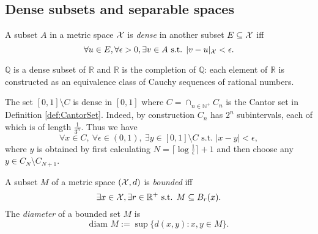 \subsection{Dense subsets and separable spaces}
\label{sec:dense-subsets}

\begin{defn}
  \label{def:denseSetMetricSpace}
  A subset $A$ in a metric space ${\cal X}$
  is \emph{dense} in another subset $E\subseteq {\cal X}$
  iff
  \begin{equation}
    \label{eq:denseSet}
    \forall u\in E, \forall \epsilon>0, \exists v\in A
    \text{ s.t. } |v-u|_{\cal X} < \epsilon.
  \end{equation}
\end{defn}

\begin{exm}
  \label{exm:QisDenseInR}
  $\mathbb{Q}$ is a dense subset of $\mathbb{R}$
  and $\mathbb{R}$ is the completion of $\mathbb{Q}$:
  each element of $\mathbb{R}$ is constructed
  as an equivalence class of Cauchy sequences of rational numbers.
\end{exm}

\begin{exm}
  \label{exm:CantorSetRemovedDense}
  The set $[0,1]\setminus C$ is dense in $[0,1]$
  where $C=\cap_{n\in \mathbb{N}^+} C_n$ is the Cantor set
  in Definition \ref{def:CantorSet}.
  Indeed, by construction $C_n$ has $2^{n}$ subintervals,
  each of which is of length $\frac{1}{3^n}$.
  Thus we have
  \begin{displaymath}
    \forall x\in C,\ \forall \epsilon\in (0,1),\
    \exists y\in [0,1]\setminus C \text{ s.t. }
    |x-y|<\epsilon,
  \end{displaymath}
  where $y$ is obtained by first calculating
  $N=\lceil \log\frac{1}{\epsilon}\rceil+1$
  and then choose any $y\in C_N\setminus C_{N+1}$.
\end{exm}

\begin{defn}
  \label{def:Boundedness}
  A subset $M$ of a metric space $({\cal X},d)$
  is \emph{bounded} iff
  \begin{equation}
    \label{eq:bounded}
    \exists x\in{\cal X}, \exists r\in \mathbb{R}^+
    \text{ s.t. } M \subseteq B_r(x).
  \end{equation}
  The \emph{diameter} of a bounded set $M$ is
  \begin{equation}
    \label{eq:diameter}
    \text{diam } M := \sup\{d(x,y): x,y\in M\}.
  \end{equation}
\end{defn}

